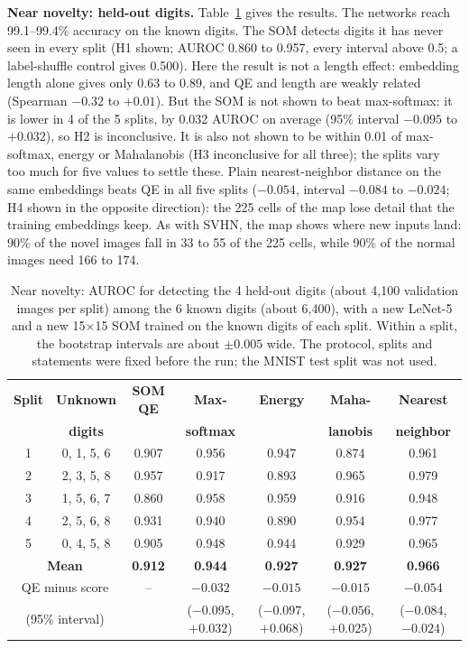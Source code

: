 \documentclass[11pt]{article}
\begin{document}
\textbf{Near novelty: held-out digits.} Table~\ref{tab:heldout} gives the results. The networks reach 99.1--99.4\% accuracy on the known digits. The SOM detects digits it has never seen in every split (H1 shown; AUROC 0.860 to 0.957, every interval above 0.5; a label-shuffle control gives 0.500). Here the result is not a length effect: embedding length alone gives only 0.63 to 0.89, and QE and length are weakly related (Spearman $-0.32$ to $+0.01$).
But the SOM is not shown to beat max-softmax: it is lower in 4 of the 5 splits, by 0.032 AUROC on average (95\% interval $-0.095$ to $+0.032$), so H2 is inconclusive. It is also not shown to be within 0.01 of max-softmax, energy or Mahalanobis (H3 inconclusive for all three); the splits vary too much for five values to settle these. Plain nearest-neighbor distance on the same embeddings beats QE in all five splits ($-0.054$, interval $-0.084$ to $-0.024$; H4 shown in the opposite direction): the 225 cells of the map lose detail that the training embeddings keep.
As with SVHN, the map shows where new inputs land: 90\% of the novel images fall in 33 to 55 of the 225 cells, while 90\% of the normal images need 166 to 174.

\begin{table}[H]
\centering
\renewcommand{\arraystretch}{1.12}
\footnotesize
\setlength{\tabcolsep}{4pt}
\begin{tabular}{|c|c|c|c|c|c|c|}
\hline
\textbf{Split} & \textbf{Unknown} & \textbf{SOM QE} & \textbf{Max-} & \textbf{Energy} & \textbf{Maha-} & \textbf{Nearest} \\
 & \textbf{digits} & & \textbf{softmax} & & \textbf{lanobis} & \textbf{neighbor} \\ \hline
1 & 0, 1, 5, 6 & 0.907 & 0.956 & 0.947 & 0.874 & 0.961 \\ \hline
2 & 2, 3, 5, 8 & 0.957 & 0.917 & 0.893 & 0.965 & 0.979 \\ \hline
3 & 1, 5, 6, 7 & 0.860 & 0.958 & 0.959 & 0.916 & 0.948 \\ \hline
4 & 2, 5, 6, 8 & 0.931 & 0.940 & 0.890 & 0.954 & 0.977 \\ \hline
5 & 0, 4, 5, 8 & 0.905 & 0.948 & 0.944 & 0.929 & 0.965 \\ \hline
\multicolumn{2}{|c|}{\textbf{Mean}} & \textbf{0.912} & \textbf{0.944} & \textbf{0.927} & \textbf{0.927} & \textbf{0.966} \\ \hline
\multicolumn{2}{|c|}{QE minus score} & -- & $-0.032$ & $-0.015$ & $-0.015$ & $-0.054$ \\
\multicolumn{2}{|c|}{(95\% interval)} & & ($-0.095$, $+0.032$) & ($-0.097$, $+0.068$) & ($-0.056$, $+0.025$) & ($-0.084$, $-0.024$) \\ \hline
\end{tabular}
\caption{Near novelty: AUROC for detecting the 4 held-out digits (about 4,100 validation images per split) among the 6 known digits (about 6,400), with a new LeNet-5 and a new 15$\times$15 SOM trained on the known digits of each split. Within a split, the bootstrap intervals are about $\pm0.005$ wide. The protocol, splits and statements were fixed before the run; the MNIST test split was not used.}
\label{tab:heldout}
\end{table}
\end{document}
